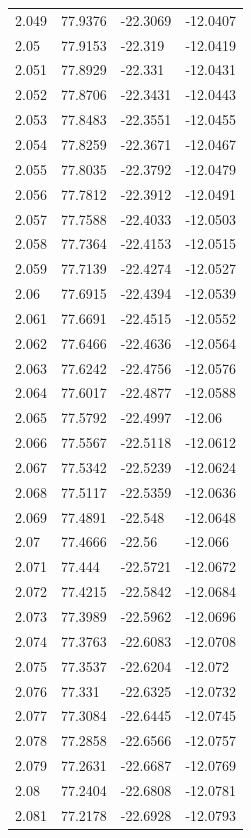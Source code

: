 \begin{tabular}{llll}
2.049 & 77.9376 & -22.3069 & -12.0407 \\
2.05 & 77.9153 & -22.319 & -12.0419 \\
2.051 & 77.8929 & -22.331 & -12.0431 \\
2.052 & 77.8706 & -22.3431 & -12.0443 \\
2.053 & 77.8483 & -22.3551 & -12.0455 \\
2.054 & 77.8259 & -22.3671 & -12.0467 \\
2.055 & 77.8035 & -22.3792 & -12.0479 \\
2.056 & 77.7812 & -22.3912 & -12.0491 \\
2.057 & 77.7588 & -22.4033 & -12.0503 \\
2.058 & 77.7364 & -22.4153 & -12.0515 \\
2.059 & 77.7139 & -22.4274 & -12.0527 \\
2.06 & 77.6915 & -22.4394 & -12.0539 \\
2.061 & 77.6691 & -22.4515 & -12.0552 \\
2.062 & 77.6466 & -22.4636 & -12.0564 \\
2.063 & 77.6242 & -22.4756 & -12.0576 \\
2.064 & 77.6017 & -22.4877 & -12.0588 \\
2.065 & 77.5792 & -22.4997 & -12.06 \\
2.066 & 77.5567 & -22.5118 & -12.0612 \\
2.067 & 77.5342 & -22.5239 & -12.0624 \\
2.068 & 77.5117 & -22.5359 & -12.0636 \\
2.069 & 77.4891 & -22.548 & -12.0648 \\
2.07 & 77.4666 & -22.56 & -12.066 \\
2.071 & 77.444 & -22.5721 & -12.0672 \\
2.072 & 77.4215 & -22.5842 & -12.0684 \\
2.073 & 77.3989 & -22.5962 & -12.0696 \\
2.074 & 77.3763 & -22.6083 & -12.0708 \\
2.075 & 77.3537 & -22.6204 & -12.072 \\
2.076 & 77.331 & -22.6325 & -12.0732 \\
2.077 & 77.3084 & -22.6445 & -12.0745 \\
2.078 & 77.2858 & -22.6566 & -12.0757 \\
2.079 & 77.2631 & -22.6687 & -12.0769 \\
2.08 & 77.2404 & -22.6808 & -12.0781 \\
2.081 & 77.2178 & -22.6928 & -12.0793 \\

\end{tabular}
